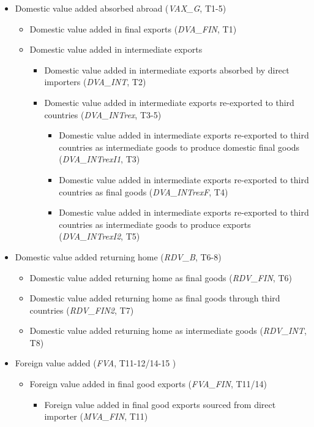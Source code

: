 \documentclass[11pt,a4paper]{article}
\begin{document}
\begin{itemize}
\item Domestic value added absorbed abroad (\textit{VAX\_G}, T1-5)
\begin{itemize}
\item Domestic value added in final exports (\textit{DVA\_FIN}, T1)
\item Domestic value added in intermediate exports
\begin{itemize}
\item Domestic value added in intermediate exports absorbed by direct importers (\textit{DVA\_INT}, T2)
\item Domestic value added in intermediate exports re-exported to third countries (\textit{DVA\_INTrex}, T3-5)
\begin{itemize}
\item Domestic value added in intermediate exports re-exported to third countries as intermediate goods to produce domestic final goods (\textit{DVA\_INTrexI1}, T3)
\item Domestic value added in intermediate exports re-exported to third countries as  final goods (\textit{DVA\_INTrexF}, T4)
\item Domestic value added in intermediate exports re-exported to third countries as intermediate goods to produce exports (\textit{DVA\_INTrexI2}, T5)
\end{itemize}
\end{itemize}
\end{itemize}
\item Domestic value added returning home (\textit{RDV\_B}, T6-8)
\begin{itemize}
\item Domestic value added returning home as final goods (\textit{RDV\_FIN}, T6)
\item Domestic value added returning home as final goods through third countries (\textit{RDV\_FIN2}, T7)
\item Domestic value added returning home as intermediate goods (\textit{RDV\_INT}, T8)
\end{itemize}
\item Foreign value added (\textit{FVA}, T11-12/14-15 )
\begin{itemize}
\item Foreign value added in final good exports (\textit{FVA\_FIN}, T11/14)
\begin{itemize}
\item Foreign value added in final good exports sourced from direct importer (\textit{MVA\_FIN}, T11)

\end{itemize}
\end{itemize}
\end{itemize}
\end{document}
